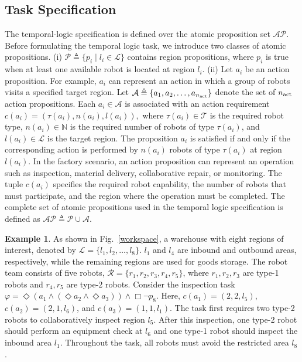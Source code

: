 \documentclass[lettersize,journal]{IEEEtran}
\theoremstyle{italiclemma}
\theoremstyle{italiclemma}
\theoremstyle{definition}
\newtheorem{example}{Example}
\begin{document}
\subsection{Task Specification}

The temporal-logic specification is defined over the atomic proposition set \(\mathcal{AP}\). 
Before formulating the temporal logic task, we introduce two classes of atomic propositions.  
(i) $ \mathcal{P} \triangleq \{p_i \mid l_i\in\mathcal{L}\}$  contains region propositions, where \(p_i\) is true when at least one available robot is located at
region $l_i$.
(ii) Let $a_i$ be an action proposition. For example, $a_i$ can represent an action in which a group of robots visits a specified target region.  Let
$ \mathcal{A}\triangleq \{a_1,a_2,\ldots,a_{n_{\rm act}}\} $
denote the set of $n_{\rm act}$ action propositions. Each $a_i\in\mathcal{A}$ is associated with an action requirement $ c(a_i)=(\tau(a_i),n(a_i),l(a_i)),  $
where $\tau(a_i)\in\mathcal{T}$ is the required robot type, $n(a_i)\in\mathbb{N}$ is the required number of robots of type $\tau(a_i)$, and $l(a_i)\in\mathcal{L}$ is the target region. The proposition $a_i$ is satisfied if and only if the corresponding action is performed by $n(a_i)$ robots of type $\tau(a_i)$ at region $l(a_i)$.
In the factory scenario, an action proposition can represent an operation such as inspection, material delivery, collaborative repair, or monitoring. The tuple $c(a_i)$ specifies the required robot capability, the number of robots that must participate, and the region where the operation must be completed.
The complete set of atomic propositions used in the temporal logic specification is defined as
$\mathcal{AP}\triangleq \mathcal{P}\cup\mathcal{A}$.

\begin{example}\label{ex:warehouse}
As shown in Fig.~\ref{workspace}, a warehouse with eight regions of interest, denoted by $\mathcal{L}=\{l_1,l_2,\ldots,l_8\}$. $l_1$ and $l_4$ are inbound and outbound areas, respectively, while the remaining regions are used for goods storage. The robot team consists of five robots, $\mathcal{R}=\{r_1,r_2,r_3,r_4,r_5\}$, where $r_1,r_2,r_3$ are type-1 robots and $r_4,r_5$ are type-2 robots. Consider the inspection task $\varphi=\Diamond\left(a_1\wedge(\Diamond a_2\wedge\Diamond a_3)\right)\wedge\Box\neg p_8$.
Here, $c(a_1)=(2,2,l_5)$, $c(a_2)=(2,1,l_6)$, and $c(a_3)=(1,1,l_1)$. 
The task first requires two type-2 robots to collaboratively inspect region $l_5$. After this inspection, one type-2 robot should perform an equipment check at $l_6$ and one type-1 robot should inspect the inbound area $l_1$. Throughout the task, all robots must avoid the restricted area $l_8$.
\end{example}
\end{document}

